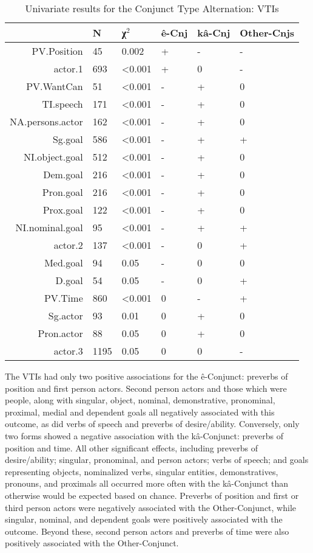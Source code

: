 \begin{table}[H]
  \centering
  \footnotesize
\begin{tabular}{rlllll}
    \toprule
 & N & χ$^{2}$ & ê-Cnj & kâ-Cnj & Other-Cnjs \\
\midrule
 
PV.Position & 45 & 0.002 & + & - & -  \\
actor.1 & 693 & \textless{}0.001 & + & 0 & -  \\
PV.WantCan & 51 & \textless{}0.001 & - & + & 0  \\
TI.speech & 171 & \textless{}0.001 & - & + & 0  \\
NA.persons.actor & 162 & \textless{}0.001 & - & + & 0  \\
Sg.goal & 586 & \textless{}0.001 & - & + & +  \\
NI.object.goal & 512 & \textless{}0.001 & - & + & 0  \\
Dem.goal & 216 & \textless{}0.001 & - & + & 0  \\
Pron.goal & 216 & \textless{}0.001 & - & + & 0  \\
Prox.goal & 122 & \textless{}0.001 & - & + & 0  \\
NI.nominal.goal & 95 & \textless{}0.001 & - & + & +  \\
actor.2 & 137 & \textless{}0.001 & - & 0 & +  \\
Med.goal & 94 & 0.05 & - & 0 & 0  \\
D.goal & 54 & 0.05 & - & 0 & +  \\
PV.Time & 860 & \textless{}0.001 & 0 & - & +  \\
Sg.actor & 93 & 0.01 & 0 & + & 0  \\
Pron.actor & 88 & 0.05 & 0 & + & 0  \\
actor.3 & 1195 & 0.05 & 0 & 0 & -  \\

  \bottomrule
  \end{tabular}
  \caption{
   Univariate results for the Conjunct Type Alternation: VTIs \\ \label{tab:ticnjuni}
  }
\end{table}

The VTIs had only two positive associations for the ê-Conjunct: preverbs of position and first person actors. Second person actors and those which were people, along with singular, object, nominal, demonstrative, pronominal, proximal, medial and dependent goals all negatively associated with this outcome, as did verbs of speech and preverbs of desire/ability. Conversely, only two forms showed a negative association with the kâ-Conjunct: preverbs of position and time. All other significant effects, including preverbs of desire/ability; singular, pronominal, and person actors; verbs of speech; and goals representing objects, nominalized verbs, singular entities, demonstratives, pronouns, and proximals all occurred more often with the kâ-Conjunct than otherwise would be expected based on chance. Preverbs of position and first or third person actors were negatively associated with the Other-Conjunct, while singular, nominal, and dependent goals were positively associated with the outcome. Beyond these, second person actors and preverbs of time were also positively associated with the Other-Conjunct.
\FloatBarrier

